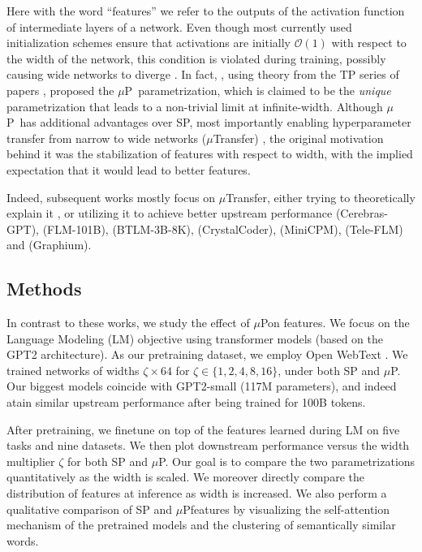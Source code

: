 \documentclass{article}
\newcommand{\mup}{$\mu$P}
\newcommand{\mutransfer}{$\mu$Transfer}
\begin{document}
Here with the word ``features'' we refer to the outputs of the activation function of intermediate layers of a network. Even though most currently used initialization schemes ensure that activations are initially $\mathcal{O}(1)$ with respect to the width of the network, this condition is violated during training, possibly causing wide networks to diverge \cite{tp4}. In fact, \cite{tp4,tp5}, using theory from the TP series of papers \cite{tp0,tp1,tp2,tp2b,tp3,tp4,tp4b,tp4c,tp5,tp6}, proposed the \mup\ parametrization, which is claimed to be the \textit{unique} parametrization that leads to a non-trivial limit at infinite-width. Although \mup\ has additional advantages over SP, most importantly enabling hyperparameter transfer from narrow to wide networks (\mutransfer) \cite{tp5}, the original motivation behind it was the stabilization of features with respect to width, with the implied expectation that it would lead to better features.

Indeed, subsequent works mostly focus on \mutransfer, either trying to theoretically explain it \cite{noci}, or utilizing it to achieve better upstream performance \cite{cerebras} (Cerebras-GPT), \cite{flm} (FLM-101B), \cite{btlm} (BTLM-3B-8K), \cite{cc} (CrystalCoder), \cite{minicpm} (MiniCPM), \cite{teleflm} (Tele-FLM) and \cite{graphium} (Graphium).

\subsection{Methods}
In contrast to these works, we study the effect of \mup on features. We focus on the Language Modeling (LM) objective using transformer models (based on the GPT2 architecture). As our pretraining dataset, we employ Open WebText \cite{owt}. We trained networks of widths $\zeta \times 64$ for $\zeta \in \{1,2,4,8,16\}$, under both SP and \mup. Our biggest models coincide with GPT2-small (117M parameters), and indeed atain similar upstream performance after being trained for 100B tokens.

After pretraining, we finetune on top of the features learned during LM on five tasks and nine datasets. We then plot downstream performance versus the width multiplier $\zeta$ for both SP and \mup. Our goal is to compare the two parametrizations quantitatively as the width is scaled. We moreover directly compare the distribution of features at inference as width is increased. We also perform a qualitative comparison of SP and \mup features by visualizing the self-attention mechanism of the pretrained models and the clustering of semantically similar words.
\end{document}
